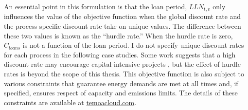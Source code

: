 An essential point in this formulation is that the loan period, $LLN_{t,v}$ only
influences the value of the objective function when the global discount rate
and the process-specific discount rate take on unique values. The difference between
these two values is known as the ``hurdle rate.'' When the hurdle rate is zero,
$C_{loans}$ is not a function of the loan period. I
do not specify unique discount rates for each process in the following case studies.
Some work suggests that a high discount rate may encourage capital-intensive projects \cite{alzbutas_uncertainty_2012,
decarolis_modelling_2016}, but the effect of hurdle rates is beyond the scope of
this thesis. This objective function is also subject to various constraints that
guarantee energy demands are met at all times and, if specified, ensures respect
of capacity and emissions limits. The details of these constraints are available
at \href{https://temoacloud.com/temoaproject/Documentation.html#the-math-behind-temoa}{temoacloud.com}.

